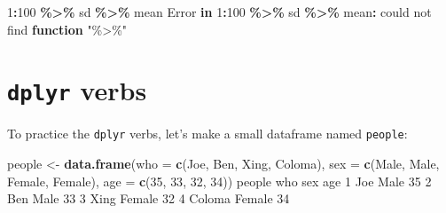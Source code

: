 \documentclass[
]{book}
\newenvironment{Shaded}{\begin{snugshade}}{\end{snugshade}}
\newcommand{\AttributeTok}[1]{\textcolor[rgb]{0.13,0.29,0.53}{#1}}
\newcommand{\ControlFlowTok}[1]{\textcolor[rgb]{0.13,0.29,0.53}{\textbf{#1}}}
\newcommand{\DecValTok}[1]{\textcolor[rgb]{0.00,0.00,0.81}{#1}}
\newcommand{\FunctionTok}[1]{\textcolor[rgb]{0.13,0.29,0.53}{\textbf{#1}}}
\newcommand{\NormalTok}[1]{#1}
\newcommand{\OtherTok}[1]{\textcolor[rgb]{0.56,0.35,0.01}{#1}}
\newcommand{\SpecialCharTok}[1]{\textcolor[rgb]{0.81,0.36,0.00}{\textbf{#1}}}
\newcommand{\StringTok}[1]{\textcolor[rgb]{0.31,0.60,0.02}{#1}}
\begin{document}
\begin{Shaded}
\begin{Highlighting}[]
\DecValTok{1}\SpecialCharTok{:}\DecValTok{100} \SpecialCharTok{\%\textgreater{}\%}\NormalTok{ sd }\SpecialCharTok{\%\textgreater{}\%}\NormalTok{ mean}
\NormalTok{Error }\ControlFlowTok{in} \DecValTok{1}\SpecialCharTok{:}\DecValTok{100} \SpecialCharTok{\%\textgreater{}\%}\NormalTok{ sd }\SpecialCharTok{\%\textgreater{}\%}\NormalTok{ mean}\SpecialCharTok{:}\NormalTok{ could not find }\ControlFlowTok{function} \StringTok{"\%\textgreater{}\%"}
\end{Highlighting}
\end{Shaded}

\section*{\texorpdfstring{\texttt{dplyr} verbs}{dplyr verbs}}\label{dplyr-verbs}

To practice the \texttt{dplyr} verbs, let's make a small dataframe named \texttt{people}:

\begin{Shaded}
\begin{Highlighting}[]
\NormalTok{people }\OtherTok{\textless{}{-}} \FunctionTok{data.frame}\NormalTok{(}\AttributeTok{who =} \FunctionTok{c}\NormalTok{(}\StringTok{\textquotesingle{}Joe\textquotesingle{}}\NormalTok{, }\StringTok{\textquotesingle{}Ben\textquotesingle{}}\NormalTok{, }\StringTok{\textquotesingle{}Xing\textquotesingle{}}\NormalTok{, }\StringTok{\textquotesingle{}Coloma\textquotesingle{}}\NormalTok{),}
                    \AttributeTok{sex =} \FunctionTok{c}\NormalTok{(}\StringTok{\textquotesingle{}Male\textquotesingle{}}\NormalTok{, }\StringTok{\textquotesingle{}Male\textquotesingle{}}\NormalTok{, }\StringTok{\textquotesingle{}Female\textquotesingle{}}\NormalTok{, }\StringTok{\textquotesingle{}Female\textquotesingle{}}\NormalTok{),}
                    \AttributeTok{age =} \FunctionTok{c}\NormalTok{(}\DecValTok{35}\NormalTok{, }\DecValTok{33}\NormalTok{, }\DecValTok{32}\NormalTok{, }\DecValTok{34}\NormalTok{))}
\NormalTok{people}
\NormalTok{     who    sex age}
\DecValTok{1}\NormalTok{    Joe   Male  }\DecValTok{35}
\DecValTok{2}\NormalTok{    Ben   Male  }\DecValTok{33}
\DecValTok{3}\NormalTok{   Xing Female  }\DecValTok{32}
\DecValTok{4}\NormalTok{ Coloma Female  }\DecValTok{34}
\end{Highlighting}
\end{Shaded}
\end{document}
